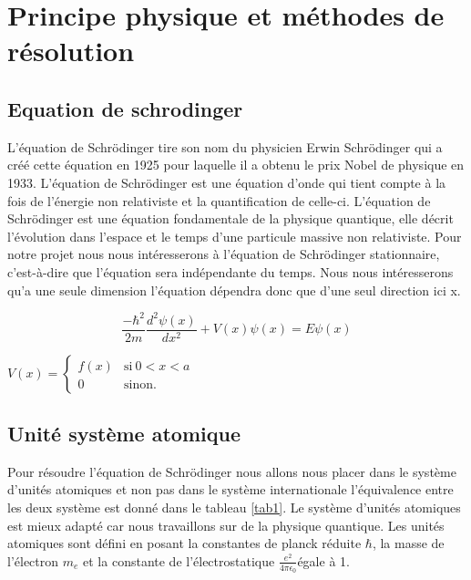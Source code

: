 \section{Principe physique et méthodes de résolution}

\subsection{Equation de schrodinger}
L’équation de Schrödinger tire son nom du physicien Erwin Schrödinger qui a créé cette équation en 1925 pour laquelle il a obtenu le prix Nobel de physique en 1933. L’équation de Schrödinger est une équation d’onde qui tient compte à la fois de l’énergie non relativiste et la quantification de celle-ci. L’équation de Schrödinger est une équation fondamentale de la physique quantique, elle décrit l’évolution dans l’espace et le temps d’une particule massive non relativiste. Pour notre projet nous nous intéresserons à l’équation de Schrödinger stationnaire\cite{texier2015mecanique}, c’est-à-dire que l’équation sera indépendante du temps. Nous nous intéresserons qu’a une seule dimension l’équation dépendra donc que d’une seul direction ici x.

\begin{equation} \label{eq:schrodinger}
 \frac{-\hbar^2}{2m}\frac{d^2\psi(x)}{dx^2 }+V(x)\psi(x)=E\psi(x)
\end{equation}
\begin{center}
$ V(x) = \left\{
    \begin{array}{ll}
       f(x) & \mbox{si}\ 0<x<a \\
       0 & \mbox{sinon.}
    \end{array}
\right.$
\end{center}

\subsection{Unité système atomique}

Pour résoudre l’équation de Schrödinger nous allons nous placer dans le système d'unités atomiques \cite{frwiki:193318984}et non pas dans le système internationale l'équivalence entre les deux système est donné dans le tableau \ref{tab1}. Le système d’unités atomiques est mieux adapté car nous travaillons sur de la physique quantique. Les unités atomiques sont défini en posant la constantes de planck réduite $\hbar$, la masse de l’électron $m_{e}$  et la constante de l'électrostatique $\frac{e^2}{4\pi\epsilon_{0}}$égale à 1.


